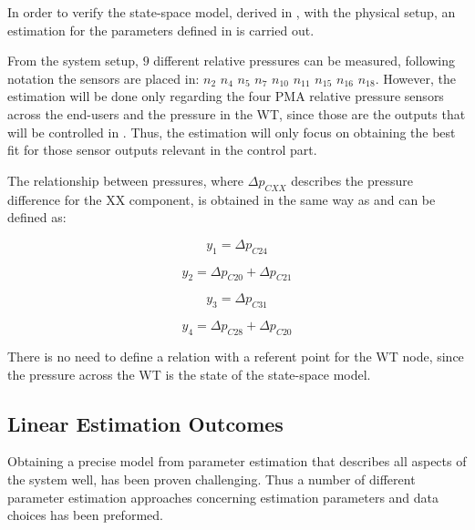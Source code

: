 In order to verify the state-space model, derived in , with the physical setup, an estimation for the parameters defined in 
is carried out.

From the system setup, $9$ different relative pressures can be measured, following  notation the sensors are placed in: 
$n_2$ $n_4$ $n_5$ $n_7$ $n_{10}$ $n_{11}$ $n_{15}$ $n_{16}$ $n_{18}$. However, the estimation will be done only regarding the four PMA relative pressure 
sensors across the end-users and the pressure in the WT, since those are the outputs that will be controlled in . Thus, the estimation will only focus on obtaining the best fit for those sensor outputs relevant in the control part. 

The relationship between pressures, where $\Delta p_{CXX}$ describes the pressure difference for the XX component, is obtained in the same way as  and can be defined as:

\vspace{4mm}
\begin {equation}
     y_1 = \Delta p_{C24} 
\end{equation}

\vspace{4mm}
\begin {equation}
     y_2 = \Delta p_{C20} + \Delta p_{C21} 
\end{equation}


\vspace{4mm}
\begin {equation}
     y_3 = \Delta p_{C31} 
\end{equation}

\vspace{4mm}
\begin {equation}
     y_4 = \Delta p_{C28} + \Delta p_{C20}  
\end{equation}

There is no need to define a relation with a referent point for the WT node, since the pressure across the WT is the state of the state-space model. 


\subsection{Linear Estimation Outcomes}

Obtaining a precise model from parameter estimation that describes all aspects of the system well, has been proven challenging. Thus a number of different parameter estimation approaches concerning estimation parameters and data choices has been preformed.   


